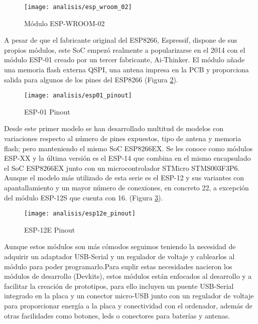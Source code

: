\documentclass[../proyecto.tex]{subfiles}
\begin{document}
\begin{figure}[h]
\centering
\texttt{[image: analisis/esp\_wroom\_02]}
\caption{Módulo ESP-WROOM-02}
\label{fig:esp_wrom_02}
\end{figure}

A pesar de que el fabricante original del ESP8266, Espressif, dispone de sus propios módulos, este SoC empezó realmente a popularizarse en el 2014 con el módulo ESP-01 creado por un tercer fabricante, Ai-Thinker. El módulo añade una memoria flash externa QSPI, una antena impresa en la PCB y proporciona salida para algunos de los pines del ESP8266 (Figura \ref{fig:esp01_pinout}).\\

\begin{figure}[H]
\centering
\texttt{[image: analisis/esp01\_pinout]}
\caption{ESP-01 Pinout}
\label{fig:esp01_pinout}
\end{figure}

Desde este primer modelo se han desarrollado multitud de modelos con variaciones respecto al número de pines expuestos, tipo de antena y memoria flash; pero manteniendo el mismo SoC ESP8266EX. Se les conoce como módulos ESP-XX y la última versión es el ESP-14 que combina en el mismo encapsulado el SoC ESP8266EX junto con un microcontrolador STMicro STMS003F3P6. Aunque el modelo más utilizado de esta serie es el ESP-12 y sus variantes con apantallamiento y un mayor número de conexiones, en concreto 22, a excepción del módulo ESP-12S que cuenta con 16. (Figura \ref{fig:esp12e_pinout}).\\

\begin{figure}[H]
\centering
\texttt{[image: analisis/esp12e\_pinout]}
\caption{ESP-12E Pinout}
\label{fig:esp12e_pinout}
\end{figure}

Aunque estos módulos son más cómodos seguimos teniendo la necesidad de adquirir un adaptador USB-Serial y un regulador de voltaje y cablearlos al módulo para poder programarlo.Para suplir estas necesidades nacieron los módulos de desarrollo (Devkits), estos módulos están enfocados al desarrollo y a facilitar la creación de prototipos, para ello incluyen un puente USB-Serial integrado en la placa y un conector micro-USB junto con un regulador de voltaje para proporcionar energía a la placa y conectividad con el ordenador, además de otras facilidades como botones, leds o conectores para baterías y antenas.\\
\end{document}
